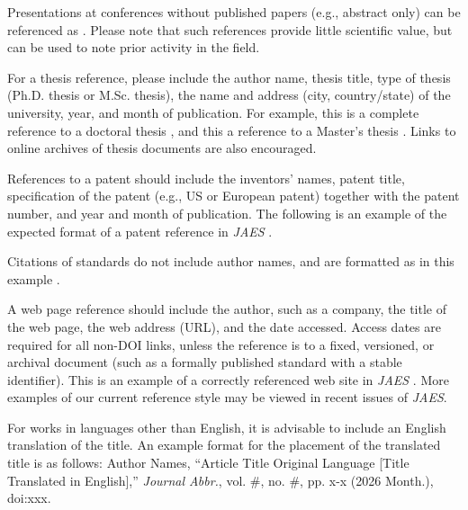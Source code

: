 \documentclass[fleqn,draft]{jaes}
\begin{document}
Presentations at conferences without published papers (e.g., abstract only) can be referenced as \cite{a_conference_presentation}. Please note that such references provide little scientific value, but can be used to note prior activity in the field. 

For a thesis reference, please include the author name, thesis title, type of thesis (Ph.D. thesis or M.Sc. thesis), the name and address (city, country/state) of the university, year, and month of publication. For example, this is a complete reference to a doctoral thesis \cite{a_PhD_thesis}, and this a reference to a Master's thesis \cite{an_MSc_thesis}. Links to online archives of thesis documents are also encouraged.

References to a patent should include the inventors’ names, patent title, specification of the patent (e.g., US or European patent) together with the patent number, and year and month of publication. The following is an example of the expected format of a patent reference in \emph{JAES} \cite{a_patent}. 

Citations of standards do not include author names, and are formatted as in this example \cite{a_standard}.

A web page reference should include the author, such as a company, the title of the web page, the web address (URL), and the date accessed.
Access dates are required for all non-DOI links, unless the reference is to a fixed, versioned, or archival document (such as a formally published standard with a stable identifier). This is an example of a correctly referenced web site in \emph{JAES} \cite{a_web_page}. More examples of our current reference style may be viewed in recent issues of \emph{JAES}.

For works in languages other than English, it is advisable to include an English translation of the title. An example format for the placement of the translated title is as follows: Author Names, ``Article Title Original Language [Title Translated in English],'' \textit{Journal Abbr.}, vol. \#, no. \#, pp. x-x (2026 Month.), doi:xxx.
\end{document}
